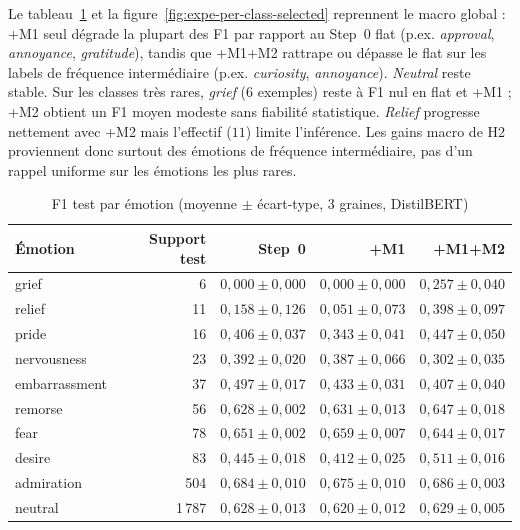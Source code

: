 Le tableau~\ref{tab:expe-per-class-f1} et la
figure~\ref{fig:expe-per-class-selected} reprennent le macro global :
+M1 seul dégrade la plupart des F1 par rapport au Step~0 flat (p.ex.
\emph{approval}, \emph{annoyance}, \emph{gratitude}), tandis que +M1+M2
rattrape ou dépasse le flat sur les labels de fréquence intermédiaire
(p.ex. \emph{curiosity}, \emph{annoyance}). \emph{Neutral} reste stable.
Sur les classes très rares, \emph{grief} ($6$ exemples) reste à F1 nul
en flat et +M1 ; +M2 obtient un F1 moyen modeste sans fiabilité
statistique. \emph{Relief} progresse nettement avec +M2 mais l'effectif
($11$) limite l'inférence. Les gains macro de H2 proviennent donc surtout
des émotions de fréquence intermédiaire, pas d'un rappel uniforme sur
les émotions les plus rares.

\begin{table}[H]
\centering
\caption{F1 test par émotion (moyenne $\pm$ écart-type, 3 graines, DistilBERT)}
\label{tab:expe-per-class-f1}
\renewcommand{\arraystretch}{1.2}
\begin{tabular}{|l|r|r|r|r|}
\hline
\textbf{Émotion} & \textbf{Support test} & \textbf{Step~0} & \textbf{+M1} & \textbf{+M1+M2} \\
\hline
grief & 6 & $0{,}000 \pm 0{,}000$ & $0{,}000 \pm 0{,}000$ & $0{,}257 \pm 0{,}040$ \\
\hline
relief & 11 & $0{,}158 \pm 0{,}126$ & $0{,}051 \pm 0{,}073$ & $0{,}398 \pm 0{,}097$ \\
\hline
pride & 16 & $0{,}406 \pm 0{,}037$ & $0{,}343 \pm 0{,}041$ & $0{,}447 \pm 0{,}050$ \\
\hline
nervousness & 23 & $0{,}392 \pm 0{,}020$ & $0{,}387 \pm 0{,}066$ & $0{,}302 \pm 0{,}035$ \\
\hline
embarrassment & 37 & $0{,}497 \pm 0{,}017$ & $0{,}433 \pm 0{,}031$ & $0{,}407 \pm 0{,}040$ \\
\hline
remorse & 56 & $0{,}628 \pm 0{,}002$ & $0{,}631 \pm 0{,}013$ & $0{,}647 \pm 0{,}018$ \\
\hline
fear & 78 & $0{,}651 \pm 0{,}002$ & $0{,}659 \pm 0{,}007$ & $0{,}644 \pm 0{,}017$ \\
\hline
desire & 83 & $0{,}445 \pm 0{,}018$ & $0{,}412 \pm 0{,}025$ & $0{,}511 \pm 0{,}016$ \\
\hline
admiration & 504 & $0{,}684 \pm 0{,}010$ & $0{,}675 \pm 0{,}010$ & $0{,}686 \pm 0{,}003$ \\
\hline
neutral & 1\,787 & $0{,}628 \pm 0{,}013$ & $0{,}620 \pm 0{,}012$ & $0{,}629 \pm 0{,}005$ \\
\hline
\end{tabular}
\end{table}

